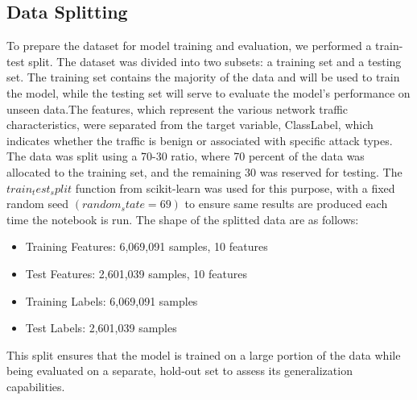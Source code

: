 \documentclass[conference]{IEEEtran}
\begin{document}
	\subsection{Data Splitting}
	To prepare the dataset for model training and evaluation, we performed a train-test split. The dataset was divided into two subsets: a training set and a testing set. The training set contains the majority of the data and will be used to train the model, while the testing set will serve to evaluate the model's performance on unseen data.The features, which represent the various network traffic characteristics, were separated from the target variable, ClassLabel, which indicates whether the traffic is benign or associated with specific attack types. The data was split using a 70-30 ratio, where 70 percent of the data was allocated to the training set, and the remaining 30 was reserved for testing. The $train_test_split$ function from scikit-learn was used for this purpose, with a fixed random seed $(random_state=69)$ to ensure same results are produced each time the notebook is run. The shape of the splitted data are as follows:
	\begin{itemize}
		\item Training Features: 6,069,091 samples, 10 features
		\item Test Features: 2,601,039 samples, 10 features
		\item Training Labels: 6,069,091 samples
		\item Test Labels: 2,601,039 samples
	\end{itemize}
	This split ensures that the model is trained on a large portion of the data while being evaluated on a separate, hold-out set to assess its generalization capabilities.
	
\end{document}
